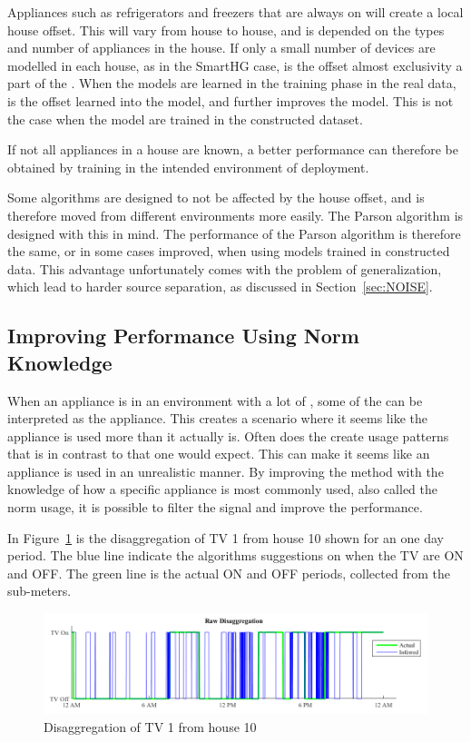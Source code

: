 Appliances such as refrigerators and freezers that are always on will create a local house offset. This will vary from house to house, and is depended on the types and number of appliances in the house. If only a small number of devices are modelled in each house, as in the SmartHG case, is the offset almost exclusivity a part of the . When the models are learned in the training phase in the real data, is the offset learned into the model, and further improves the model. This is not the case when the model are trained in the constructed dataset. 

If not all appliances in a house are known, a better performance can therefore be obtained by training in the intended environment of deployment. 

Some algorithms are designed to not be affected by the house offset, and is therefore moved from different environments more easily. The Parson algorithm is designed with this in mind. The performance of the Parson algorithm is therefore the same, or in some cases improved, when using models trained in constructed data. This advantage unfortunately comes with the problem of generalization, which lead to harder source separation, as discussed in Section~\ref{sec:NOISE}. 

\subsection{Improving Performance Using Norm Knowledge}
\label{sec:NormFilter}
When an appliance is in an environment with a lot of , some of the  can be interpreted as the appliance. This  creates a scenario where it seems like the appliance is used more than it actually is. Often does the  create usage patterns that is in contrast to that one would expect. This can make it seems like an appliance is used in an unrealistic manner. By improving the method with the knowledge of how a specific appliance is most commonly used, also called the norm usage, it is possible to filter the signal and improve the performance. 

In Figure~\ref{fig:Norm1} is the disaggregation of TV 1 from house 10 shown for an one day period. The blue line indicate the  algorithms suggestions on when the TV are ON and OFF. The green line is the actual ON and OFF periods, collected from the sub-meters. 

\begin{figure}[H]
\centering
\includegraphics[width=1\textwidth]{billeder/AppNormFilterH10_1.png}
\caption{Disaggregation of TV 1 from house 10}
\label{fig:Norm1}
\end{figure}

